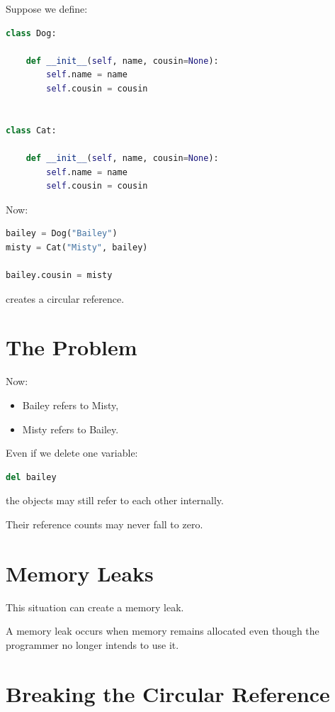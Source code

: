 \documentclass[11pt]{article}
\begin{document}
Suppose we define:

\begin{lstlisting}[language=Python]
class Dog:

    def __init__(self, name, cousin=None):
        self.name = name
        self.cousin = cousin


class Cat:

    def __init__(self, name, cousin=None):
        self.name = name
        self.cousin = cousin
\end{lstlisting}

Now:

\begin{lstlisting}[language=Python]
bailey = Dog("Bailey")
misty = Cat("Misty", bailey)

bailey.cousin = misty
\end{lstlisting}

creates a circular reference.

\section{The Problem}

Now:

\begin{itemize}
    \item Bailey refers to Misty,
    \item Misty refers to Bailey.
\end{itemize}

Even if we delete one variable:

\begin{lstlisting}[language=Python]
del bailey
\end{lstlisting}

the objects may still refer to each other internally.

Their reference counts may never fall to zero.

\section{Memory Leaks}

This situation can create a memory leak.

A memory leak occurs when memory remains allocated even though the programmer no longer intends to use it.

\section{Breaking the Circular Reference}
\end{document}
